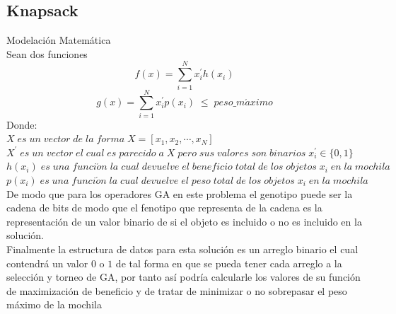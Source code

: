 \documentclass[10pt]{article}
\begin{document}
\subsection{Knapsack}
Modelación Matemática\\
Sean dos funciones
\[f(x)=\sum_{i=1}^{N}x^{'}_{i}h(x_{i})\]
\[g(x)=\sum_{i=1}^{N}x^{'}_{i}p(x_{i})\;\leq\;peso\_m\acute{a}ximo\]
Donde:\\
\(\displaystyle X\;es\;un\;vector\;de\;la\;forma\;X=[x_{1},x_{2},\cdots,x_{N}]\)\\\vspace{0.25cm}
\(\displaystyle X^{'}\;es\;un\;vector\;el\;cual\;es\;parecido\;a\;X\;pero\;sus\;valores\;son\;binarios\;x_{i}^{'}\in\{0,1\}\)\\\vspace{0.25cm}
\(\displaystyle h(x_{i})\;es\;una\;funci\acute{o}n\;la\;cual\;devuelve\;el\;beneficio\;total\;de\;los\;objetos\;x_{i}\;en\;la\;mochila\)\\\vspace{0.25cm}
\(\displaystyle p(x_{i})\;es\;una\;funci\acute{o}n\;la\;cual\;devuelve\;el\;peso\;total\;de\;los\;objetos\;x_{i}\;en\;la\;mochila\)\\\vspace{0.25cm}
De modo que para los operadores GA en este problema el genotipo puede ser la cadena de bits de modo que el fenotipo que representa de la cadena es la representación de un valor binario de si el objeto es incluido o no es incluido en la solución.\\
Finalmente la estructura de datos para esta solución es un arreglo binario el cual contendrá un valor $0$ o $1$ de tal forma en que se pueda tener cada arreglo a la selección y torneo de GA, por tanto así podría calcularle los valores de su función de maximización de beneficio y de tratar de minimizar o no sobrepasar el peso máximo de la mochila
\end{document}

